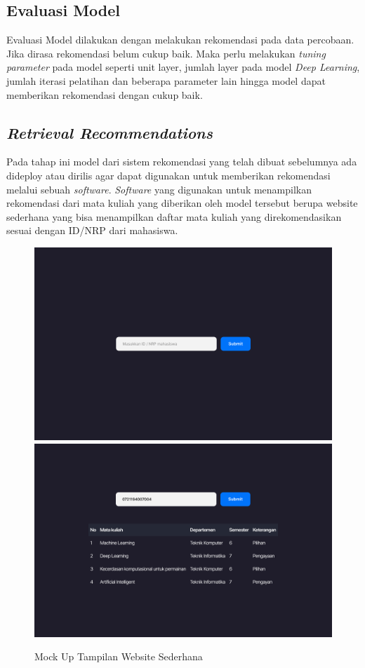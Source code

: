 \begin{adjustwidth}{1em}{0pt}
  \subsection{Evaluasi Model}
  Evaluasi Model dilakukan dengan melakukan rekomendasi pada data percobaan. Jika dirasa rekomendasi belum cukup baik. Maka perlu melakukan \emph{tuning parameter} pada model seperti unit layer,
  jumlah layer pada model \emph{Deep Learning}, jumlah iterasi pelatihan dan beberapa parameter lain hingga model dapat memberikan rekomendasi dengan cukup baik.

  \subsection{\emph{Retrieval Recommendations}}
  Pada tahap ini model dari sistem rekomendasi yang telah dibuat sebelumnya ada dideploy atau dirilis agar dapat digunakan untuk memberikan rekomendasi melalui sebuah \emph{software}.
  \emph{Software} yang digunakan untuk menampilkan rekomendasi dari mata kuliah yang diberikan oleh model tersebut berupa website sederhana yang bisa menampilkan daftar mata kuliah
  yang direkomendasikan sesuai dengan ID/NRP dari mahasiswa.

  \begin{figure} [ht] \centering
    \includegraphics[width=150mm]{gambar/mockup-1.png}
    \vspace{2em}
    \includegraphics[width=150mm]{gambar/mockup-2.png}
    \caption{Mock Up Tampilan Website Sederhana}
  \end{figure}

\end{adjustwidth}



